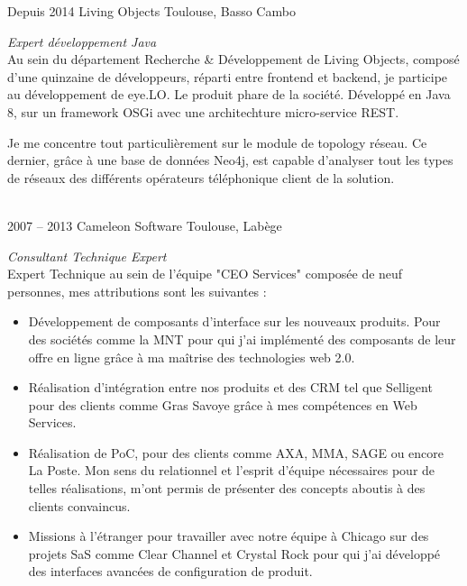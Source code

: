 \documentclass{friggeri-cv} 	%
\begin{document}
\begin{entrylist}
\entry
{Depuis 2014}
{Living Objects}
{Toulouse, Basso Cambo}
{\vspace{0.2cm}\emph{Expert développement Java} \\
Au sein du département Recherche \& Développement de Living Objects, composé d'une quinzaine de développeurs,
réparti entre frontend et backend, je participe au développement de eye.LO. Le produit phare de la société. Développé
en Java 8, sur un framework OSGi avec une architechture micro-service REST.

Je me concentre tout particulièrement sur le module de topology réseau. Ce dernier, grâce à une base de données Neo4j,
est capable d'analyser tout les types de réseaux des différents opérateurs téléphonique client de la solution.
}\\

\entry
{2007 -- 2013}
{Cameleon Software}
{Toulouse, Labège}
{\vspace{0.2cm}\emph{Consultant Technique Expert} \\
Expert Technique au sein de l'équipe "CEO Services" composée de neuf personnes, mes attributions sont les suivantes :
\begin{itemize}
\item Développement de composants d’interface sur les nouveaux produits. Pour des sociétés
comme la MNT pour qui j’ai implémenté des composants de leur offre en ligne grâce à ma
maîtrise des technologies web 2.0.
\item Réalisation d’intégration entre nos produits et des CRM tel que Selligent pour des clients
comme Gras Savoye grâce à mes compétences en Web Services.
\item Réalisation de PoC, pour des clients comme AXA, MMA, SAGE ou encore La Poste. Mon sens
du relationnel et l'esprit d'équipe nécessaires pour de telles réalisations, m'ont permis de
présenter des concepts aboutis à des clients convaincus.
\item Missions à l’étranger pour travailler avec notre équipe à Chicago sur des projets SaS comme
Clear Channel et Crystal Rock pour qui j'ai développé des interfaces avancées de
configuration de produit.
\end{itemize}

}
\end{entrylist}
\end{document}
